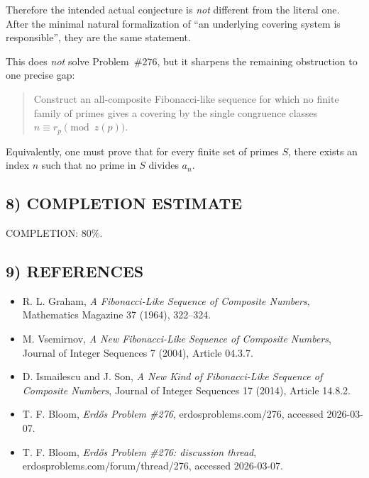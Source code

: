 Therefore the intended actual conjecture is \emph{not} different from the literal one. After the minimal natural formalization of ``an underlying covering system is responsible'', they are the same statement.

This does \emph{not} solve Problem~\#276, but it sharpens the remaining obstruction to one precise gap:
\begin{quote}
Construct an all-composite Fibonacci-like sequence for which no finite family of primes gives a covering by the single congruence classes $n\equiv r_p\pmod{z(p)}$.
\end{quote}

Equivalently, one must prove that for every finite set of primes $S$, there exists an index $n$ such that no prime in $S$ divides $a_n$.

\subsection*{8) COMPLETION ESTIMATE}
COMPLETION: 80\%.

\subsection*{9) REFERENCES}
\begin{itemize}
\item R. L. Graham, \emph{A Fibonacci-Like Sequence of Composite Numbers}, Mathematics Magazine 37 (1964), 322--324.
\item M. Vsemirnov, \emph{A New Fibonacci-Like Sequence of Composite Numbers}, Journal of Integer Sequences 7 (2004), Article 04.3.7.
\item D. Ismailescu and J. Son, \emph{A New Kind of Fibonacci-Like Sequence of Composite Numbers}, Journal of Integer Sequences 17 (2014), Article 14.8.2.
\item T. F. Bloom, \emph{Erd\H{o}s Problem \#276}, erdosproblems.com/276, accessed 2026-03-07.
\item T. F. Bloom, \emph{Erd\H{o}s Problem \#276: discussion thread}, erdosproblems.com/forum/thread/276, accessed 2026-03-07.
\end{itemize}

